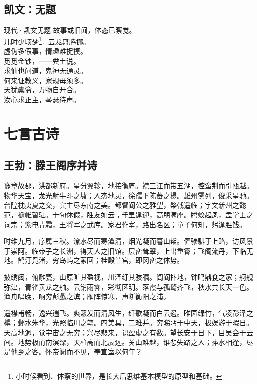 \documentclass[12pt,oneside,a5paper]{book}
\begin{document}
\chapter*{凯文：无题}
\begin{poemzh}{现代·凯文}{无题}
故事或旧闻，体态已察觉。\\
儿时少顷梦\footnote[1]{小时候看到、体察的世界，是长大后思维基本模型的原型和基础。}，云龙舞腾挪。\\
虚伪多假事，情趣难捉摸。\\
觅觅金钞，一一粪土说。\\
求仙也问道，鬼神无通灵。\\
何来证教义，家规毋须多。\\
天犹橐龠，万物自开合。\\
汝心求正主，琴瑟待声。\\
\end{poemzh}

\part{七言古诗}

\chapter{王勃：滕王阁序并诗}

豫章故郡，洪都新府。星分翼轸，地接衡庐。襟三江而带五湖，控蛮荆而引瓯越。物华天宝，龙光射牛斗之墟；人杰地灵，徐孺下陈蕃之榻。雄州雾列，俊采星驰。台隍枕夷夏之交，宾主尽东南之美。都督阎公之雅望，棨戟遥临；宇文新州之懿范，襜帷暂驻。十旬休假，胜友如云；千里逢迎，高朋满座。腾蛟起凤，孟学士之词宗；紫电青霜，王将军之武库。家君作宰，路出名区；童子何知，躬逢胜饯。

时维九月，序属三秋。潦水尽而寒潭清，烟光凝而暮山紫。俨骖騑于上路，访风景于崇阿。临帝子之长洲，得天人之旧馆。层峦耸翠，上出重霄；飞阁流丹，下临无地。鹤汀凫渚，穷岛屿之萦回；桂殿兰宫，即冈峦之体势。

披绣闼，俯雕甍，山原旷其盈视，川泽纡其骇瞩。闾阎扑地，钟鸣鼎食之家；舸舰弥津，青雀黄龙之舳。云销雨霁，彩彻区明。落霞与孤鹜齐飞，秋水共长天一色。渔舟唱晚，响穷彭蠡之滨；雁阵惊寒，声断衡阳之浦。

遥襟甫畅，逸兴遄飞。爽籁发而清风生，纤歌凝而白云遏。睢园绿竹，气凌彭泽之樽；邺水朱华，光照临川之笔。四美具，二难并。穷睇眄于中天，极娱游于暇日。天高地迥，觉宇宙之无穷；兴尽悲来，识盈虚之有数。望长安于日下，目吴会于云间。地势极而南溟深，天柱高而北辰远。关山难越，谁悲失路之人；萍水相逢，尽是他乡之客。怀帝阍而不见，奉宣室以何年？
\end{document}
